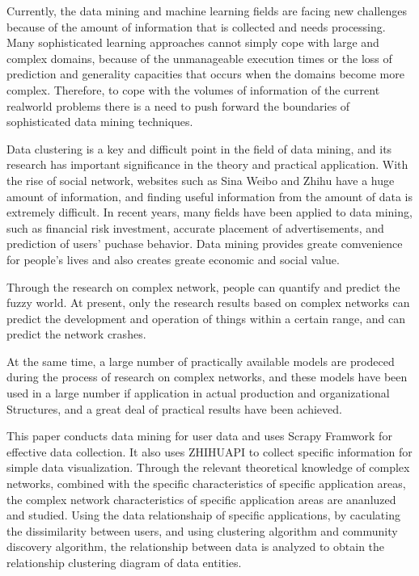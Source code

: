 \documentclass[bachelor,adobefonts]{jnuthesis}
\begin{document}
\begin{englishabstract}
  Currently, the data mining and machine learning fields are facing new challenges because of the amount of information that is collected and needs processing. 
  Many sophisticated learning approaches cannot simply cope with large and complex domains, 
  because of the unmanageable execution times or the loss of prediction and generality capacities that occurs when the domains become more complex.
   Therefore, to cope with the volumes of information of the current realworld problems there is a need to push forward the boundaries of sophisticated data mining techniques. 

  Data clustering is a key and difficult point in the field of data mining, and its research has important significance in
  the theory and practical application.
  With the rise of social network, websites such as Sina Weibo and Zhihu have a huge amount of information, and 
  finding useful information from the amount of data is extremely difficult.
  In recent years, many fields have been applied to data mining, such as financial risk investment, accurate placement of advertisements, 
  and prediction of users' puchase behavior. 
  Data mining provides greate comvenience for people's lives and also creates greate economic and social value.

  Through the research on complex network, people can quantify and predict the fuzzy world. 
  At present, only the research results based on complex networks can predict the development and operation of things within a certain range, 
  and can predict the network crashes.

  At the same time, a large number of practically available models are prodeced during the process of research on complex networks,
  and these models have been used in a large number if application in actual production and organizational Structures,
  and a great deal of practical results have been achieved.

  This paper conducts data mining for user data and uses Scrapy Framwork for effective data collection. 
  It also uses ZHIHUAPI to collect specific information for simple data visualization.
  Through the relevant theoretical knowledge of complex networks, combined with the specific characteristics
  of specific application areas, the complex network characteristics of specific application areas are ananluzed and studied.
  Using the data relationshaip of specific applications, by caculating the dissimilarity between users, 
  and using clustering algorithm and community discovery algorithm, 
  the relationship between data is analyzed to obtain the relationship clustering diagram of data entities.
  





\end{englishabstract}
\end{document}
